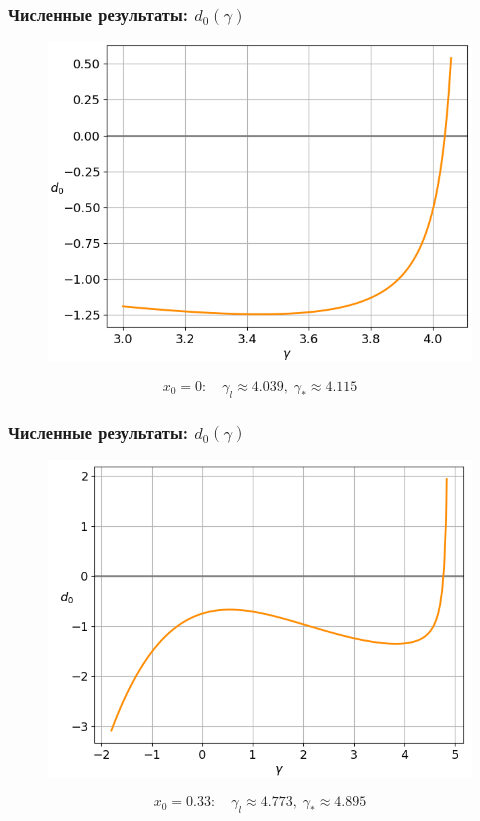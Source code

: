 \documentclass[fullscreen=true, unicode, bookmarks=false]{beamer}
\begin{document}
\begin{frame}
\frametitle{ Численные результаты: $ d_0(\gamma) $ }

\begin{figure} 
\includegraphics[scale=0.55]{divergent_d0_0,00.png}  
\end{figure}

$$ x_0 = 0: \quad \gamma_l \approx 4.039, \; \gamma_* \approx 4.115 $$

\end{frame}

\begin{frame}
\frametitle{ Численные результаты: $ d_0(\gamma) $ }

\begin{figure} 
\includegraphics[scale=0.55]{divergent_d0_0,33.png}  
\end{figure}

$$ x_0 = 0.33: \quad \gamma_l \approx 4.773, \; \gamma_* \approx 4.895 $$

\end{frame}
\end{document}
